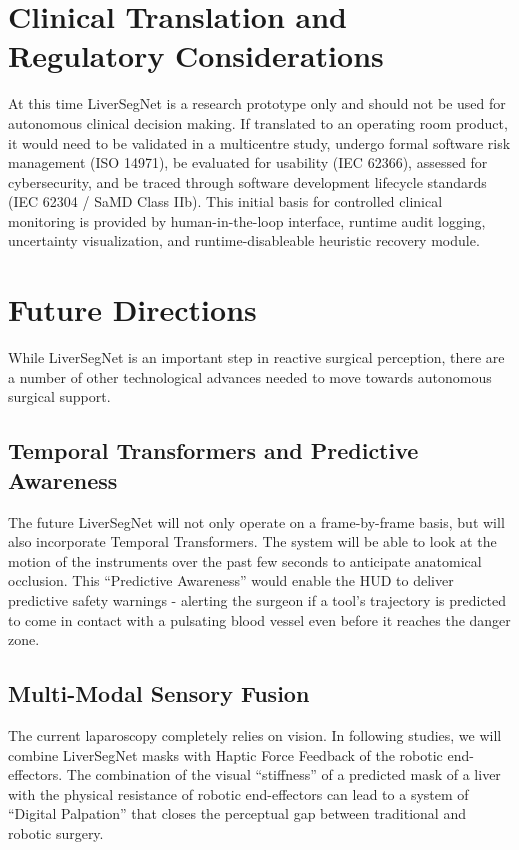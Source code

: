 \documentclass[conference]{IEEEtran}
\begin{document}
\section{Clinical Translation and Regulatory Considerations}
At this time LiverSegNet is a research prototype only and should not be used for autonomous clinical decision making. If translated to an operating room product, it would need to be validated in a multicentre study, undergo formal software risk management (ISO 14971), be evaluated for usability (IEC 62366), assessed for cybersecurity, and be traced through software development lifecycle standards (IEC 62304 / SaMD Class IIb). This initial basis for controlled clinical monitoring is provided by human-in-the-loop interface, runtime audit logging, uncertainty visualization, and runtime-disableable heuristic recovery module.

\section{Future Directions}
While LiverSegNet is an important step in reactive surgical perception, there are a number of other technological advances needed to move towards autonomous surgical support.

\subsection{Temporal Transformers and Predictive Awareness}
The future LiverSegNet will not only operate on a frame-by-frame basis, but will also incorporate Temporal Transformers. The system will be able to look at the motion of the instruments over the past few seconds to anticipate anatomical occlusion. This ``Predictive Awareness'' would enable the HUD to deliver predictive safety warnings - alerting the surgeon if a tool's trajectory is predicted to come in contact with a pulsating blood vessel even before it reaches the danger zone.

\subsection{Multi-Modal Sensory Fusion}
The current laparoscopy completely relies on vision. In following studies, we will combine LiverSegNet masks with Haptic Force Feedback of the robotic end-effectors. The combination of the visual ``stiffness'' of a predicted mask of a liver with the physical resistance of robotic end-effectors can lead to a system of ``Digital Palpation'' that closes the perceptual gap between traditional and robotic surgery.
\end{document}

